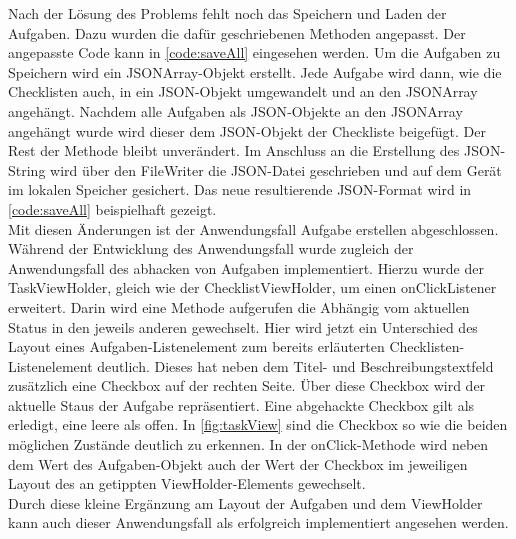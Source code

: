 Nach der Lösung des Problems fehlt noch das Speichern und Laden der Aufgaben. Dazu wurden die dafür geschriebenen Methoden angepasst. Der angepasste Code kann in \autoref{code:saveAll} eingesehen werden. Um die Aufgaben zu Speichern wird ein \ac{JSON}Array-Objekt erstellt. Jede Aufgabe wird dann, wie die Checklisten auch, in ein \ac{JSON}-Objekt umgewandelt und an den \ac{JSON}Array angehängt. Nachdem alle Aufgaben als \ac{JSON}-Objekte an den \ac{JSON}Array angehängt wurde wird dieser dem \ac{JSON}-Objekt der Checkliste beigefügt. Der Rest der Methode bleibt unverändert. Im Anschluss an die Erstellung des \ac{JSON}-String wird über den FileWriter die \ac{JSON}-Datei geschrieben und auf dem Gerät im lokalen Speicher gesichert. Das neue resultierende \ac{JSON}-Format wird in \autoref{code:saveAll} beispielhaft gezeigt.
\\




Mit diesen Änderungen ist der Anwendungsfall Aufgabe erstellen abgeschlossen. Während der Entwicklung des Anwendungsfall wurde zugleich der Anwendungsfall des abhacken von Aufgaben implementiert. Hierzu wurde der TaskViewHolder, gleich wie der ChecklistViewHolder, um einen onClickListener erweitert. Darin wird eine Methode aufgerufen die Abhängig vom aktuellen Status in den jeweils anderen gewechselt. Hier wird jetzt ein Unterschied des Layout eines Aufgaben-Listenelement zum bereits erläuterten Checklisten-Listenelement deutlich. Dieses hat neben dem Titel- und Beschreibungstextfeld zusätzlich eine Checkbox auf der rechten Seite. Über diese Checkbox wird der aktuelle Staus der Aufgabe repräsentiert. Eine abgehackte Checkbox gilt als erledigt, eine leere als offen. In \autoref{fig:taskView} sind die Checkbox so wie die beiden möglichen Zustände deutlich zu erkennen. In der onClick-Methode wird neben dem Wert des Aufgaben-Objekt auch der Wert der Checkbox im jeweiligen Layout des an getippten ViewHolder-Elements gewechselt.\\
Durch diese kleine Ergänzung am Layout der Aufgaben und dem ViewHolder kann auch dieser Anwendungsfall als erfolgreich implementiert angesehen werden.

